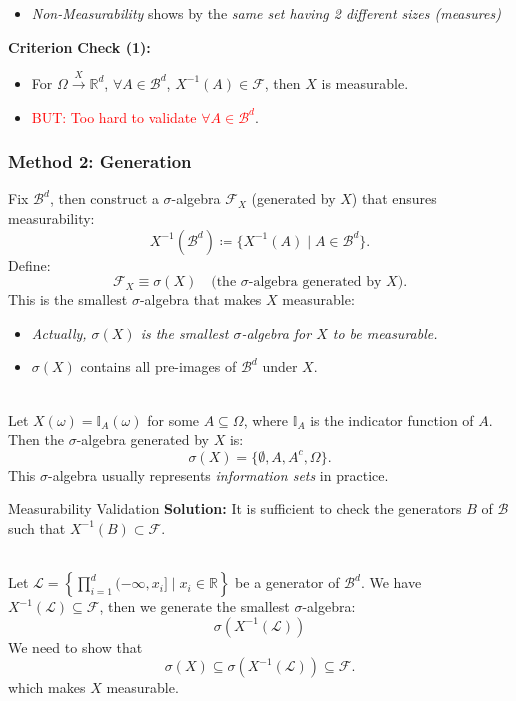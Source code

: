 \begin{itemize}
    \item \textit{Non-Measurability} shows by the \textit{same set having 2 different sizes (measures)}
\end{itemize}

\textbf{Criterion}
\textbf{Check (1):}
\begin{itemize}
    \item For \( \Omega \xrightarrow{X} \mathbb{R}^d \), \( \forall A \in \mathscr{B}^d \), \( X^{-1}(A) \in \mathscr{F} \), then \( X \) is measurable.
    \item \textcolor{red}{BUT: Too hard to validate \( \forall A \in \mathscr{B}^d \)}.
\end{itemize}

\subsubsection{Method 2: Generation}
Fix \(\mathscr{B}^d\), then construct a \(\sigma\)-algebra \(\mathscr{F}_X\) (generated by \(X\)) that ensures measurability:
\[
X^{-1}(\mathscr{B}^d) \coloneqq \{X^{-1}(A) \mid A \in \mathscr{B}^d\}.
\]
Define:
\[
\mathscr{F}_X \equiv \sigma(X) \quad \text{(the \(\sigma\)-algebra generated by \(X\))}.
\]
\noindent This is the smallest \(\sigma\)-algebra that makes \(X\) measurable:
\begin{itemize}
    \item \textit{Actually, \(\sigma(X)\) is the smallest \(\sigma\)-algebra for \(X\) to be measurable.}
    \item \(\sigma(X)\) contains all pre-images of \(\mathscr{B}^d\) under \(X\).
\end{itemize}

\begin{eg}{}\\
Let \( X(\omega) = \mathbb{I}_A(\omega) \) for some \( A \subseteq \Omega \), where \( \mathbb{I}_A \) is the indicator function of \( A \). Then the \(\sigma\)-algebra generated by \( X \) is:
\[
\sigma(X) = \{\emptyset, A, A^c, \Omega \}.
\]
This \(\sigma\)-algebra usually represents \textit{information sets} in practice.
\end{eg}

\begin{thm}{Measurability Validation}
\textbf{Solution:} It is sufficient to check the generators \( B \) of $\mathscr{B}$ such that \( X^{-1}(B)\subset \mathscr{F}\).\\
\end{thm}

\begin{eg}\\
 Let \( \mathcal{L} = \left\{ \prod_{i=1}^d (-\infty, x_i] \mid x_i \in \mathbb{R} \right\} \) be a generator of \( \mathscr{B}^d \).
 We have \( X^{-1}(\mathcal{L}) \subseteq \mathscr{F} \), then we generate the smallest \( \sigma \)-algebra:
    \[
    \sigma(X^{-1}(\mathcal{L})) \]
We need to show that
   \[\sigma(X) \subseteq \sigma(X^{-1}(\mathcal{L})) \subseteq \mathscr{F}.
    \]
which makes \( X \) measurable.
\end{eg}
